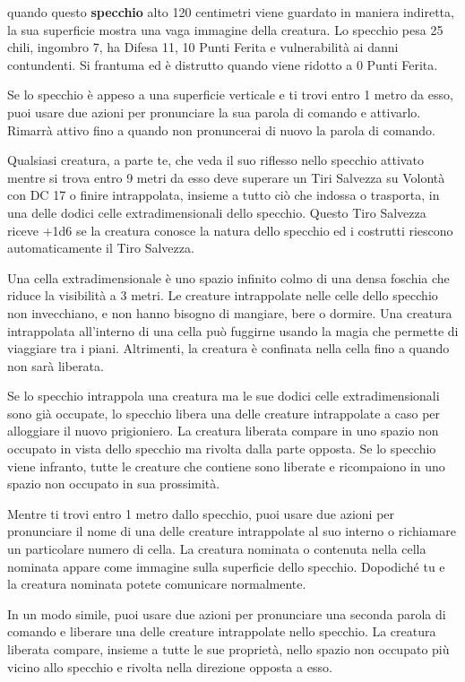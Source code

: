 \begin{multicols}{2}
quando questo \textbf{specchio} alto 120 centimetri viene guardato in maniera indiretta, la sua superficie mostra una vaga immagine della creatura. Lo specchio pesa 25 chili, ingombro 7, ha Difesa 11, 10 Punti Ferita e vulnerabilità ai danni contundenti. Si frantuma ed è distrutto quando viene ridotto a 0 Punti Ferita.

Se lo specchio è appeso a una superficie verticale e ti trovi entro 1 metro da esso, puoi usare due azioni per pronunciare la sua parola di comando e attivarlo. Rimarrà attivo fino a quando non pronuncerai di nuovo la parola di comando.

Qualsiasi creatura, a parte te, che veda il suo riflesso nello specchio attivato mentre si trova entro 9 metri da esso deve superare un Tiri Salvezza su Volontà con DC 17 o finire intrappolata, insieme a tutto ciò che indossa o trasporta, in una delle dodici celle extradimensionali dello specchio. Questo Tiro Salvezza riceve +1d6 se la creatura conosce la natura dello specchio ed i costrutti riescono automaticamente il Tiro Salvezza.

Una cella extradimensionale è uno spazio infinito colmo di una densa foschia che riduce la visibilità a 3 metri. Le creature intrappolate nelle celle dello specchio non invecchiano, e non hanno bisogno di mangiare, bere o dormire. Una creatura intrappolata all'interno di una cella può fuggirne usando la magia che permette di viaggiare tra i piani. Altrimenti, la creatura è confinata nella cella fino a quando non sarà liberata.

Se lo specchio intrappola una creatura ma le sue dodici celle extradimensionali sono già occupate, lo specchio libera una delle creature intrappolate a caso per alloggiare il nuovo prigioniero. La creatura liberata compare in uno spazio non occupato in vista dello specchio ma rivolta dalla parte opposta. Se lo specchio viene infranto, tutte le creature che contiene sono liberate e ricompaiono in uno spazio non occupato in sua prossimità.

Mentre ti trovi entro 1 metro dallo specchio, puoi usare due azioni per pronunciare il nome di una delle creature intrappolate al suo interno o richiamare un particolare numero di cella. La creatura nominata o contenuta nella cella nominata appare come immagine sulla superficie dello specchio. Dopodiché tu e la creatura nominata potete comunicare normalmente.

In un modo simile, puoi usare due azioni per pronunciare una seconda parola di comando e liberare una delle creature intrappolate nello specchio. La creatura liberata compare, insieme a tutte le sue proprietà, nello spazio non occupato più vicino allo specchio e rivolta nella direzione opposta a esso.


\end{multicols}
